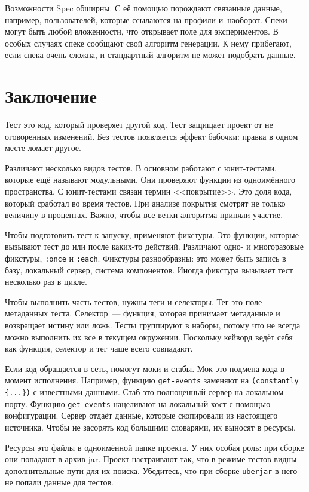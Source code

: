 Возможности Spec обширны. С её помощью порождают связанные данные, например,
пользователей, которые ссылаются на профили и~наоборот. Спеки могут быть любой
вложенности, что открывает поле для экспериментов. В особых случаях спеке
сообщают свой алгоритм генерации. К нему прибегают, если спека очень сложна, и
стандартный алгоритм не может подобрать данные.

\section{Заключение}

Тест это код, который проверяет другой код. Тест защищает проект от не
оговоренных изменений. Без тестов появляется эффект бабочки: правка в одном
месте ломает другое.


Различают несколько видов тестов. В основном работают с юнит-тестами, которые
ещё называют модульными. Они проверяют функции из одноимённого пространства. С
юнит-тестами связан термин <<покрытие>>. Это доля кода, который сработал во
время тестов. При анализе покрытия смотрят не только величину в
процентах. Важно, чтобы все ветки алгоритма приняли участие.

Чтобы подготовить тест к запуску, применяют фикстуры. Это функции, которые
вызывают тест до или после каких-то действий. Различают одно- и многоразовые
фикстуры, \verb|:once| и \verb|:each|. Фикстуры разнообразны: это может быть
запись в базу, локальный сервер, система компонентов. Иногда фикстура вызывает
тест несколько раз в цикле.

Чтобы выполнить часть тестов, нужны теги и селекторы. Тег это поле метаданных
теста. Селектор~--- функция, которая принимает метаданные и возвращает истину
или ложь. Тесты группируют в наборы, потому что не всегда можно выполнить их все
в текущем окружении. Поскольку кейворд ведёт себя как функция, селектор и
тег чаще всего совпадают.

Если код обращается в сеть, помогут моки и стабы. Мок это подмена кода в момент
исполнения. Например, функцию \verb|get-events| заменяют на
\verb|(constantly {...})| с известными данными. Стаб это полноценный сервер на
локальном порту. Функцию \verb|get-events| нацеливают на локальный хост с
помощью конфигурации. Сервер отдаёт данные, которые скопировали из настоящего
источника. Чтобы не засорять код большими словарями, их выносят в ресурсы.

Ресурсы это файлы в одноимённой папке проекта. У них особая роль: при сборке они
попадают в архив jar. Проект настраивают так, что в режиме тестов видны
дополнительные пути для их поиска. Убедитесь, что при сборке \verb|uberjar| в
него не попали данные для тестов.


